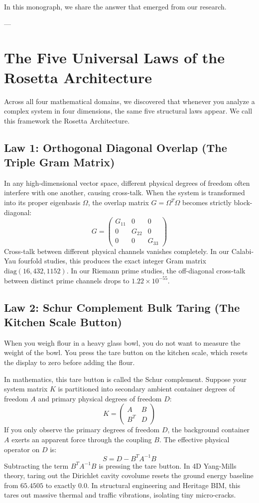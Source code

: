 \documentclass[11pt,a4paper]{article}
\begin{document}
In this monograph, we share the answer that emerged from our research.

---

\section{The Five Universal Laws of the Rosetta Architecture}

Across all four mathematical domains, we discovered that whenever you analyze a complex system in four dimensions, the same five structural laws appear. We call this framework the Rosetta Architecture.

\subsection{Law 1: Orthogonal Diagonal Overlap (The Triple Gram Matrix)}
In any high-dimensional vector space, different physical degrees of freedom often interfere with one another, causing cross-talk. When the system is transformed into its proper eigenbasis $\Omega$, the overlap matrix $G = \Omega^T \Omega$ becomes strictly block-diagonal:
$$G = \begin{pmatrix} G_{11} & 0 & 0 \\ 0 & G_{22} & 0 \\ 0 & 0 & G_{33} \end{pmatrix}$$
Cross-talk between different physical channels vanishes completely. In our Calabi-Yau fourfold studies, this produces the exact integer Gram matrix $\mathrm{diag}(16, 432, 1152)$. In our Riemann prime studies, the off-diagonal cross-talk between distinct prime channels drops to $1.22 \times 10^{-55}$.

\subsection{Law 2: Schur Complement Bulk Taring (The Kitchen Scale Button)}
When you weigh flour in a heavy glass bowl, you do not want to measure the weight of the bowl. You press the tare button on the kitchen scale, which resets the display to zero before adding the flour.

In mathematics, this tare button is called the Schur complement. Suppose your system matrix $K$ is partitioned into secondary ambient container degrees of freedom $A$ and primary physical degrees of freedom $D$:
$$K = \begin{pmatrix} A & B \\ B^T & D \end{pmatrix}$$
If you only observe the primary degrees of freedom $D$, the background container $A$ exerts an apparent force through the coupling $B$. The effective physical operator on $D$ is:
$$S = D - B^T A^{-1} B$$
Subtracting the term $B^T A^{-1} B$ is pressing the tare button. In 4D Yang-Mills theory, taring out the Dirichlet cavity covolume resets the ground energy baseline from $65.4505$ to exactly $0.0$. In structural engineering and Heritage BIM, this tares out massive thermal and traffic vibrations, isolating tiny micro-cracks.
\end{document}
